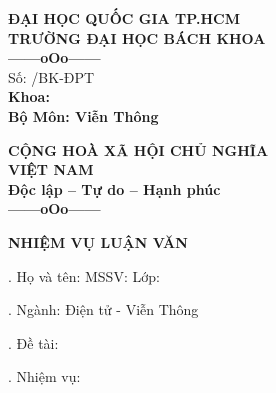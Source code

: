 
\thispagestyle{empty}

\begin{center}
\begin{minipage}[t]{0.48\textwidth}
\centering
\textbf{\small ĐẠI HỌC QUỐC GIA TP.HCM} \\
\textbf{\small TRƯỜNG ĐẠI HỌC BÁCH KHOA} \\
\vspace{0.2cm}
\textbf{\small ------oOo------} \\ %
\vspace{0.2cm}
Số: \underline{\hspace{3cm}} /BK-ĐPT \\[0.2cm]
\textbf{\small Khoa: \DEPARTMENT} \\
\textbf{\small Bộ Môn: Viễn Thông}
\end{minipage}
\hfill
\begin{minipage}[t]{0.48\textwidth}
\centering
\textbf{\small CỘNG HOÀ XÃ HỘI CHỦ NGHĨA} \\
\textbf{\small VIỆT NAM} \\
\textbf{\small Độc lập -- Tự do -- Hạnh phúc} \\
\vspace{0.2cm}
\textbf{\small ------oOo------} %
\end{minipage}
\end{center}

\vspace{0.6cm}

\begin{center}
\textbf{\large NHIỆM VỤ LUẬN VĂN}
\end{center}

\vspace{0.5cm}

. Họ và tên: \TENTACGIA \hspace{2cm} MSSV: \MSSV \hspace{2cm} Lớp: \LOP

\vspace{0.3cm}
. Ngành: Điện tử - Viễn Thông

\vspace{0.3cm}
. Đề tài: \TENLUANVAN

\vspace{0.3cm}
. Nhiệm vụ: \dotfill \\
\phantom{4. Nhiệm vụ: } \dotfill


